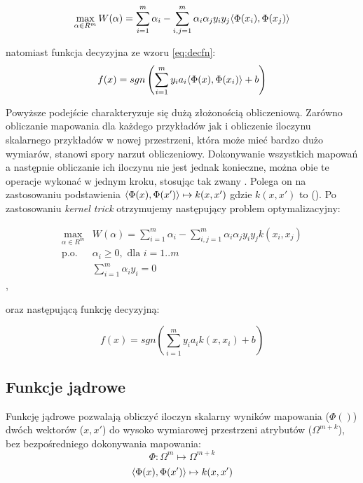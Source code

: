 \begin{equation}
\max\limits_{\alpha \in R^m}  W(\alpha) = \sum_{i=1}^{m} \alpha_i - \sum_{i,j=1}^{m} \alpha_i \alpha_j y_i y_j \langle \Phi(x_i), \Phi(x_j) \rangle
\label{eq:dual-k-target}
\end{equation}

natomiast funkcja decyzyjna ze wzoru \ref{eq:decfn}:
\begin{equation}
f(x) = sgn \left( \sum_{i=1}^{m} y_i a_i \langle \Phi(x), \Phi(x_i) \rangle + b \right)
\end{equation}

\FloatBarrier

Powyższe podejście charakteryzuje się dużą złożonością obliczeniową. Zarówno obliczanie mapowania dla każdego przykładów jak i obliczenie iloczynu skalarnego przykładów w nowej przestrzeni, która może mieć bardzo dużo wymiarów, stanowi spory narzut obliczeniowy. Dokonywanie wszystkich mapowań a następnie obliczanie ich iloczynu nie jest jednak konieczne, można obie te operacje wykonać w jednym kroku, stosując tak zwany  \cite{Boser:1992:TAO:130385.130401}. Polega on na zastosowaniu podstawienia $ \langle \Phi(x), \Phi(x') \rangle \mapsto k(x, x') $ gdzie $ k(x,x') $ to  (). Po zastosowaniu \emph{kernel trick} otrzymujemy następujący problem optymalizacyjny:

\begin{equation}
\begin{array}{ll}
\max\limits_{\alpha \in R^m} & W(\alpha) = \sum_{i=1}^{m} \alpha_i - \sum_{i,j=1}^{m} \alpha_i \alpha_j y_i y_j k(x_i, x_j) \\
\text{p.o.} &  \alpha_i \geq 0 , \text{ dla } i=1..m \\
& \sum_{i=1}^{m} \alpha_i y_i = 0
\end{array}
\label{eq:dual-k}
\end{equation},

oraz następującą funkcję decyzyjną: 

\begin{equation}
f(x) = sgn \left( \sum_{i=1}^{m} y_i a_i k(x, x_i) + b \right)
\label{eq:decfn-k}
\end{equation}

\subsection{Funkcje jądrowe}

Funkcję jądrowe pozwalają obliczyć iloczyn skalarny wyników mapowania ($ \Phi() $) dwóch wektorów ($ x, x' $) do wysoko wymiarowej przestrzeni atrybutów ($ \Omega^{m+k} $), bez bezpośredniego dokonywania mapowania:
$$ \Phi: \Omega^m \mapsto \Omega^{m+k} $$
$$ \langle \Phi(x), \Phi(x') \rangle \mapsto k(x, x')  $$

